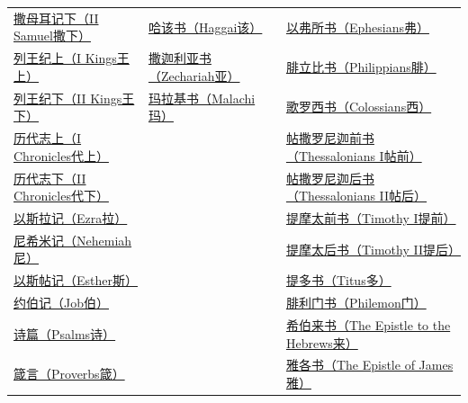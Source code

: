 \documentclass[12pt, a4paper, oneside]{ctexart}
\begin{document}
\begin{table}[ht]
\begin{tabular}{|l l  | l |l | }
			\href{https://biblehub.com/bibles/2_samuel}{撒母耳记下（II Samuel撒下）}     & \href{https://biblehub.com/bibles/haggai}{哈该书（Haggai该）}     &         & \href{https://biblehub.com/bibles/ephesians}{以弗所书（Ephesians弗）}       \\
			\href{https://biblehub.com/bibles/1_kings}{列王纪上（I Kings王上）}        & \href{https://biblehub.com/bibles/zechariah}{撒迦利亚书（Zechariah亚）} &            & \href{https://biblehub.com/bibles/philippians}{腓立比书（Philippians腓）}\\
			\href{https://biblehub.com/bibles/2_kings}{列王纪下（II Kings王下）}        & \href{https://biblehub.com/bibles/malachi}{玛拉基书（Malachi玛）}    &            & \href{https://biblehub.com/bibles/colossians}{歌罗西书（Colossians西）}\\
			\href{https://biblehub.com/bibles/1_chronicles}{历代志上（I Chronicles代上）}    &                &       & \href{https://biblehub.com/bibles/1_thessalonians}{帖撒罗尼迦前书（Thessalonians I帖前）}\\
			\href{https://biblehub.com/bibles/2_chronicles}{历代志下（II Chronicles代下）}   &                &       & \href{https://biblehub.com/bibles/2_thessalonians}{帖撒罗尼迦后书（Thessalonians II帖后）}\\
			\href{https://biblehub.com/bibles/ezra}{以斯拉记（Ezra拉）}            &                &       & \href{https://biblehub.com/bibles/1_timothy}{提摩太前书（Timothy I提前）}\\
			\href{https://biblehub.com/bibles/nehemiah}{尼希米记（Nehemiah尼）}        &                &       & \href{https://biblehub.com/bibles/2_timothy}{提摩太后书（Timothy II提后）}\\
			\href{https://biblehub.com/bibles/esther}{以斯帖记（Esther斯）}          &                &       & \href{https://biblehub.com/bibles/titus}{提多书（Titus多）}\\
			\href{https://biblehub.com/bibles/job}{约伯记（Job伯）}               &                &       & \href{https://biblehub.com/bibles/philemon}{腓利门书（Philemon门）} \\
			\cline{3-4}
			\href{https://biblehub.com/bibles/psalms}{诗篇（Psalms诗）}              &                &        & \href{https://biblehub.com/bibles/hebrews}{希伯来书（The Epistle to the Hebrews来）} \\
			\href{https://biblehub.com/bibles/proverbs}{箴言（Proverbs箴）}            &                &        & \href{https://biblehub.com/bibles/james}{雅各书（The Epistle of James雅）} \\

\end{tabular}
\end{table}
\end{document}
